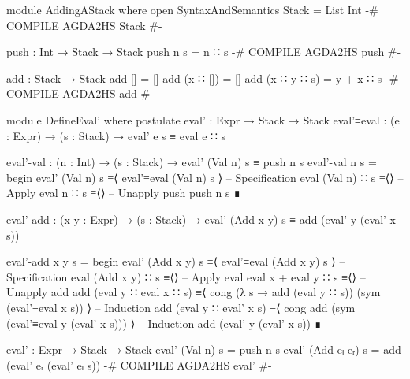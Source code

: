 \documentclass{article}
\begin{document}
\begin{code}
module AddingAStack where
  open SyntaxAndSemantics
  Stack = List Int
  {-# COMPILE AGDA2HS Stack #-}

  push : Int → Stack → Stack
  push n s = n ∷ s
  {-# COMPILE AGDA2HS push #-}

  add : Stack → Stack
  add [] = []
  add (x ∷ []) = []
  add (x ∷ y ∷ s) = y + x ∷ s
  {-# COMPILE AGDA2HS add #-}

  module DefineEval' where
    postulate
      eval' : Expr → Stack → Stack
      eval'≡eval : (e : Expr) → (s : Stack) → eval' e s ≡ eval e ∷ s

    eval'-val : (n : Int) → (s : Stack) → eval' (Val n) s ≡ push n s
    eval'-val n s =
      begin
        eval' (Val n) s
      ≡⟨ eval'≡eval (Val n) s ⟩ -- Specification
        eval (Val n) ∷ s
      ≡⟨⟩ -- Apply eval
        n ∷ s
      ≡⟨⟩ -- Unapply push
        push n s
      ∎
\end{code}
\begin{code}
    eval'-add : (x y : Expr) → (s : Stack)
      → eval' (Add x y) s ≡ add (eval' y (eval' x s))
\end{code}
\begin{code}
    eval'-add x y s =
      begin
        eval' (Add x y) s
      ≡⟨ eval'≡eval (Add x y) s ⟩ -- Specification
        eval (Add x y) ∷ s
      ≡⟨⟩ -- Apply eval
        eval x + eval y ∷ s
      ≡⟨⟩ -- Unapply add
        add (eval y ∷ eval x ∷ s)
      ≡⟨ cong (λ s → add (eval y ∷ s)) (sym (eval'≡eval x s)) ⟩ -- Induction
        add (eval y ∷ eval' x s)
      ≡⟨ cong add (sym (eval'≡eval y (eval' x s))) ⟩ -- Induction
        add (eval' y (eval' x s))
      ∎
\end{code}
\begin{code}
  eval' : Expr → Stack → Stack
  eval' (Val n) s = push n s
  eval' (Add eₗ eᵣ) s = add (eval' eᵣ (eval' eₗ s))
  {-# COMPILE AGDA2HS eval' #-}
\end{code}
\end{document}
